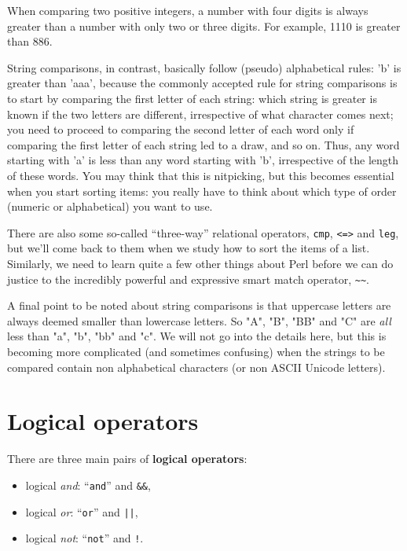 When comparing two positive integers, a number with four digits
is always greater than a number with only two or three digits. 
For example, 1110 is greater than 886. 

String comparisons, in contrast, basically follow (pseudo) alphabetical rules: 'b' is greater than 'aaa', because the commonly accepted rule for string comparisons is to start by comparing the first letter of each string: which string is greater is known if the two letters are different, irrespective of what character comes next; you need to proceed to comparing the second letter of each word only if comparing the first letter of each string led to a draw, and so on. Thus, any word starting with 'a' is less than any word starting with 'b', irrespective of the length of these words. You may think that this is nitpicking, but this becomes essential when you start sorting items: you really have to think about which type of order (numeric or alphabetical) you want to use.

There are also some so-called ``three-way'' relational operators, 
{\tt cmp}, {\tt <=>} and {\tt leg}, but we'll come back to them 
when we study how to sort the items of a list. Similarly, we need 
to learn quite a few other things about Perl before we can do 
justice to the incredibly powerful and expressive smart match 
operator, \verb"~~".
\ifplastex \else
{}
\fi


A final point to be noted about string comparisons is that uppercase letters are always deemed smaller than lowercase letters. So "A", "B", "BB" and "C" are \emph{all} less than "a", "b", "bb" and "c". We will not go into the details here, but this is becoming more complicated (and sometimes confusing) when the strings to be compared contain non alphabetical characters (or non ASCII Unicode letters).

\section{Logical operators}

There are three main pairs of {\bf logical operators}: 
\begin{itemize}
\item logical \emph{and}: ``{\tt and}'' and {\tt \&\&}, 
\item logical \emph{or}: ``{\tt or}'' and {\tt ||}, 
\item logical \emph{not}: ``{\tt not}'' and {\tt !}.
\end{itemize}

